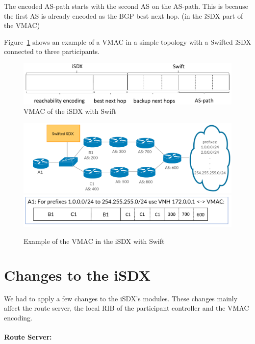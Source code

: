 The encoded AS-path starts with the second AS on the AS-path. This is because the first AS is already encoded as the BGP best next hop. (in the iSDX part of the VMAC)

Figure~\ref{fig:sixdsvmac} shows an example of a VMAC in a simple topology with a Swifted iSDX connected to three participants. 

\begin{figure}[h]
\center
\includegraphics[scale = 0.5]{Figures/design_vmac3_cropped.pdf}
\caption{VMAC of the iSDX with Swift}
\end{figure}

\begin{figure}[h]
\center
\includegraphics[scale = 0.24]{Figures/design_vmac_topology.pdf}
\includegraphics[scale = 0.35]{Figures/vmac_picture_cropped.pdf}
\caption{Example of the VMAC in the iSDX with Swift}
\label{fig:sixdsvmac}
\end{figure}

\section{\label{chapter4:Changes_to_the_iSDX}Changes to the iSDX}

We had to apply a few changes to the iSDX's modules. These changes mainly affect the route server, the local RIB of the participant controller and the VMAC encoding. 

\paragraph{\label{chapter4:Changes to the iSDX:route server}Route Server:}

